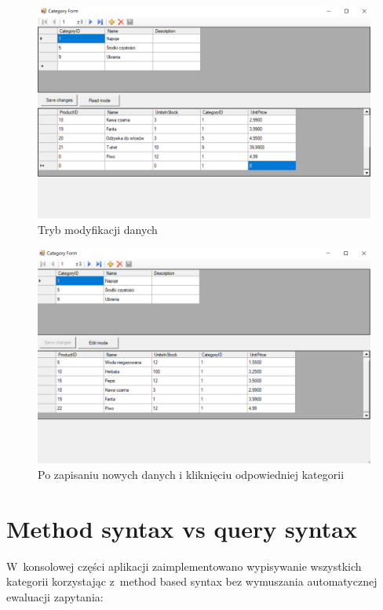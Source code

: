 \documentclass[12pt, a4paper]{mwart}
\begin{document}
\begin{figure}[h]
  \centering
  \includegraphics[scale=0.45]{IV/4-6.png}
  \caption{Tryb modyfikacji danych}
  \label{rys:4.6}
\end{figure}

\begin{figure}[ht]
  \centering
  \includegraphics[scale=0.45]{IV/4-7.png}
  \caption{Po zapisaniu nowych danych i kliknięciu odpowiedniej kategorii}
  \label{rys:4.7}
\end{figure}

\section{Method syntax vs query syntax}

W~konsolowej części aplikacji zaimplementowano wypisywanie wszystkich kategorii korzystając z~method based syntax bez wymuszania automatycznej ewaluacji zapytania:
\end{document}
